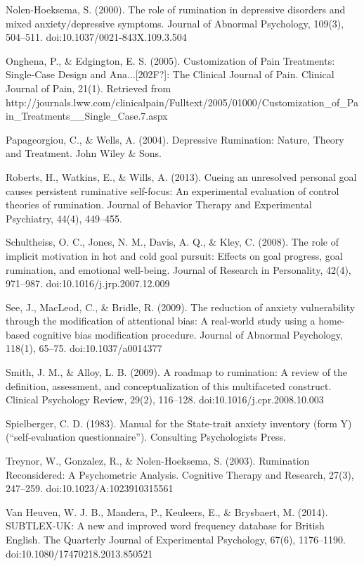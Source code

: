 \documentclass[man,a4paper]{apa6}
\begin{document}
Nolen-Hoeksema, S. (2000). The role of rumination in depressive disorders and mixed anxiety/depressive symptoms. Journal of Abnormal Psychology, 109(3), 504--511. doi:10.1037/0021-843X.109.3.504

Onghena, P., \& Edgington, E. S. (2005). Customization of Pain Treatments: Single-Case Design and Ana...[202F?]: The Clinical Journal of Pain. Clinical Journal of Pain, 21(1). Retrieved from http://journals.lww.com/clinicalpain/Fulltext/2005/01000/Customization\_of\_Pain\_Treatments\_\_Single\_Case.7.aspx

Papageorgiou, C., \& Wells, A. (2004). Depressive Rumination: Nature, Theory and Treatment. John Wiley \& Sons.

Roberts, H., Watkins, E., \& Wills, A. (2013). Cueing an unresolved personal goal causes persistent ruminative self-focus: An experimental evaluation of control theories of rumination. Journal of Behavior Therapy and Experimental Psychiatry, 44(4), 449--455.

Schultheiss, O. C., Jones, N. M., Davis, A. Q., \& Kley, C. (2008). The role of implicit motivation in hot and cold goal pursuit: Effects on goal progress, goal rumination, and emotional well-being. Journal of Research in Personality, 42(4), 971--987. doi:10.1016/j.jrp.2007.12.009

See, J., MacLeod, C., \& Bridle, R. (2009). The reduction of anxiety vulnerability through the modification of attentional bias: A real-world study using a home-based cognitive bias modification procedure. Journal of Abnormal Psychology, 118(1), 65--75. doi:10.1037/a0014377

Smith, J. M., \& Alloy, L. B. (2009). A roadmap to rumination: A review of the definition, assessment, and conceptualization of this multifaceted construct. Clinical Psychology Review, 29(2), 116--128. doi:10.1016/j.cpr.2008.10.003

Spielberger, C. D. (1983). Manual for the State-trait anxiety inventory (form Y) (``self-evaluation questionnaire''). Consulting Psychologists Press.

Treynor, W., Gonzalez, R., \& Nolen-Hoeksema, S. (2003). Rumination Reconsidered: A Psychometric Analysis. Cognitive Therapy and Research, 27(3), 247--259. doi:10.1023/A:1023910315561

Van Heuven, W. J. B., Mandera, P., Keuleers, E., \& Brysbaert, M. (2014). SUBTLEX-UK: A new and improved word frequency database for British English. The Quarterly Journal of Experimental Psychology, 67(6), 1176--1190. doi:10.1080/17470218.2013.850521
\end{document}
